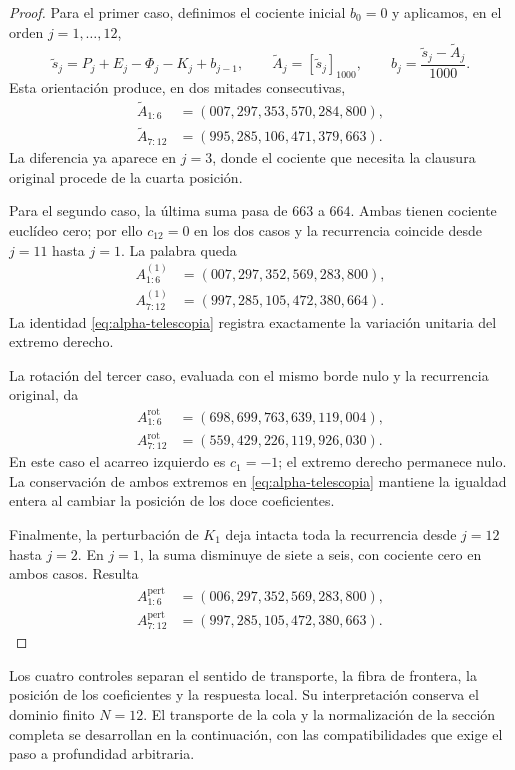 \begin{proof}
Para el primer caso, definimos el cociente inicial \(b_0=0\) y
aplicamos, en el orden \(j=1,\ldots,12\),
\[
 \widetilde s_j=P_j+E_j-\Phi_j-K_j+b_{j-1},\qquad
 \widetilde A_j=[\widetilde s_j]_{1000},\qquad
 b_j=\frac{\widetilde s_j-\widetilde A_j}{1000}.
\]
Esta orientación produce, en dos mitades consecutivas,
\begin{align*}
 \widetilde A_{1:6}&=(007,297,353,570,284,800),\\
 \widetilde A_{7:12}&=(995,285,106,471,379,663).
\end{align*}
La diferencia ya aparece en \(j=3\), donde el cociente que necesita
la clausura original procede de la cuarta posición.

Para el segundo caso, la última suma pasa de \(663\) a \(664\).
Ambas tienen cociente euclídeo cero; por ello \(c_{12}=0\) en los
dos casos y la recurrencia coincide desde \(j=11\) hasta \(j=1\).
La palabra queda
\begin{align*}
 A^{(1)}_{1:6}&=(007,297,352,569,283,800),\\
 A^{(1)}_{7:12}&=(997,285,105,472,380,664).
\end{align*}
La identidad \eqref{eq:alpha-telescopia} registra exactamente la
variación unitaria del extremo derecho.

La rotación del tercer caso, evaluada con el mismo borde nulo y la
recurrencia original, da
\begin{align*}
 A^{\mathrm{rot}}_{1:6}&=(698,699,763,639,119,004),\\
 A^{\mathrm{rot}}_{7:12}&=(559,429,226,119,926,030).
\end{align*}
En este caso el acarreo izquierdo es \(c_1=-1\); el extremo derecho
permanece nulo. La conservación de ambos extremos en
\eqref{eq:alpha-telescopia} mantiene la igualdad entera al cambiar la
posición de los doce coeficientes.

Finalmente, la perturbación de \(K_1\) deja intacta toda la
recurrencia desde \(j=12\) hasta \(j=2\). En \(j=1\), la suma
disminuye de siete a seis, con cociente cero en ambos casos. Resulta
\begin{align*}
 A^{\mathrm{pert}}_{1:6}&=(006,297,352,569,283,800),\\
 A^{\mathrm{pert}}_{7:12}&=(997,285,105,472,380,663).
\end{align*}
\end{proof}

Los cuatro controles separan el sentido de transporte, la fibra de
frontera, la posición de los coeficientes y la respuesta local. Su
interpretación conserva el dominio finito \(N=12\). El transporte
de la cola y la normalización de la sección completa se desarrollan
en la continuación, con las compatibilidades que exige el paso a
profundidad arbitraria.
